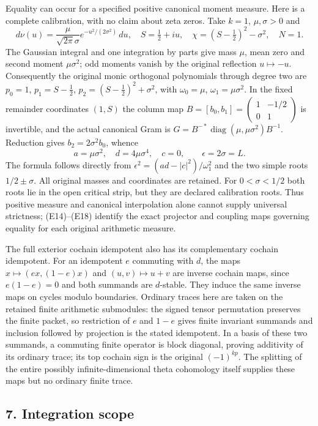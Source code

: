 Equality can occur for a specified positive canonical moment measure.
Here is a complete calibration, with no claim about zeta zeros.
Take $k=1$, $\mu,\sigma>0$ and
\[
 d\nu(u)=\frac{\mu}{\sqrt{2\pi}\sigma}
 e^{-u^2/(2\sigma^2)}\,du,\quad S=\tfrac12+iu,\quad
 \chi=(S-\tfrac12)^2-\sigma^2,\quad N=1.
 \tag{E35}
\]
The Gaussian integral and one integration by parts give mass $\mu$,
mean zero and second moment $\mu\sigma^2$; odd moments vanish by
the original reflection $u\mapsto-u$. Consequently the original
monic orthogonal polynomials through degree two are
$p_0=1$, $p_1=S-\frac12$, $p_2=(S-\frac12)^2+\sigma^2$,
with $\omega_0=\mu$, $\omega_1=\mu\sigma^2$.
In the fixed remainder coordinates $(1,S)$ the column map
$B=[b_0,b_1]=\left(\begin{smallmatrix}1&-1/2\\0&1\end{smallmatrix}\right)$
is invertible, and the actual canonical Gram is
$G=B^{-*}\operatorname{diag}(\mu,\mu\sigma^2)B^{-1}$.
Reduction gives $b_2=2\sigma^2b_0$, whence
\[
 a=\mu\sigma^2,\quad d=4\mu\sigma^4,\quad c=0,
 \qquad \epsilon=2\sigma=L.
 \tag{E36}
\]
The formula follows directly from
$\epsilon^2=(ad-|c|^2)/\omega_1^2$ and the two simple roots
$1/2\pm\sigma$. All original masses and coordinates are retained.
For $0<\sigma<1/2$ both roots lie in the open critical strip,
but they are declared calibration roots. Thus positive measure
and canonical interpolation alone cannot supply universal strictness;
(E14)--(E18) identify the exact projector and coupling maps governing
equality for each original arithmetic measure.

The full exterior cochain idempotent also has its complementary
cochain idempotent. For an idempotent $e$ commuting with $d$, the
maps $x\mapsto(ex,(1-e)x)$ and $(u,v)\mapsto u+v$ are inverse
cochain maps, since $e(1-e)=0$ and both summands are $d$-stable.
They induce the same inverse maps on cycles modulo boundaries.
Ordinary traces here are taken on the retained finite arithmetic
submodules: the signed tensor permutation preserves the finite
packet, so restriction of $e$ and $1-e$ gives finite invariant
summands and inclusion followed by projection is the stated
idempotent. In a basis of these two summands, a commuting finite
operator is block diagonal, proving additivity of its ordinary
trace; its top cochain sign is the original $(-1)^{kp}$.
The splitting of the entire possibly infinite-dimensional theta
cohomology itself supplies these maps but no ordinary finite trace.

\subsection{7. Integration scope}\label{integration-scope}


